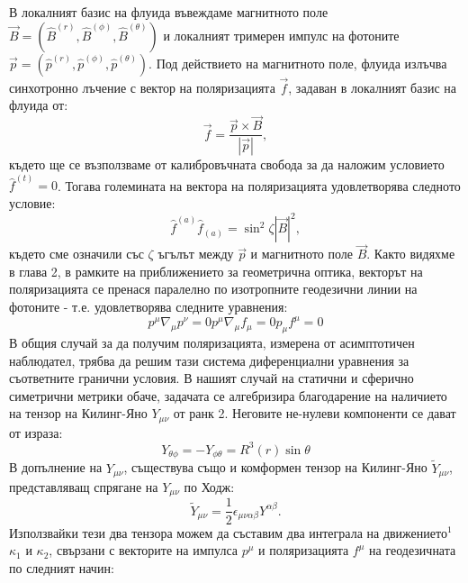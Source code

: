 В локалният базис на флуида въвеждаме магнитното поле $\vec{B} = (\hat{B}^{(r)},\hat{B}^{(\phi)},\hat{B}^{(\theta)})$ и локалният тримерен импулс на фотоните $\vec{p} = \left(\hat{p}^{(r)},\hat{p}^{(\phi)},\hat{p}^{(\theta)}\right)$. Под действието на магнитното поле, флуида излъчва синхотронно лъчение с вектор на поляризацията $\vec{f}$, задаван в локалният базис на флуида от:
\begin{equation}
	\vec{f} = \frac{\vec{p}\times\vec{B}}{|\vec{p}|},
\end{equation}
където ще се възползваме от калибровъчната свобода за да наложим условието $\hat{f}^{(t)} = 0$. Тогава големината на вектора на поляризацията удовлетворява следното условие:
\begin{equation}
	\hat{f}^{(a)}\hat{f}_{(a)} = \sin^2\zeta|\vec{B}|^2,
\end{equation}
където сме означили със $\zeta$ ъгълът между $\vec{p}$ и магнитното поле $\vec{B}$. Както видяхме в глава 2, в рамките на приближението за геометрична оптика, векторът на поляризацията се пренася паралелно по изотропните геодезични линии на фотоните - т.е. удовлетворява следните уравнения:
\begin{subequations}
	\begin{equation}
		p^\mu\nabla_\mu p^\nu = 0
	\end{equation}
	\begin{equation}
		p^\mu\nabla_\mu f_\mu = 0
	\end{equation}
	\begin{equation}
		p_\mu f^\mu = 0
	\end{equation}
\end{subequations}
В общия случай за да получим поляризацията, измерена от асимптотичен наблюдател, трябва да решим тази система диференциални уравнения за съответните гранични условия. В нашият случай на статични и сферично симетрични метрики обаче, задачата се алгебризира благодарение на наличието на тензор на Килинг-Яно $Y_{\mu\nu}$ от ранк 2. Неговите не-нулеви компоненти се дават от израза:
\begin{equation}
	Y_{\theta\phi} = -Y_{\phi\theta} = R^3(r)\sin\theta
\end{equation} 
В допълнение на $Y_{\mu\nu}$, съществува също и комформен тензор на Килинг-Яно $\tilde{Y}_{\mu\nu}$, представляващ спрягане на $Y_{\mu\nu}$ по Ходж:
\begin{equation}
	\tilde{Y}_{\mu\nu} = \frac{1}{2}\epsilon_{\mu\nu\alpha\beta}Y^{\alpha\beta}.
\end{equation}
Използвайки тези два тензора можем да съставим два интеграла на движението$^1$ $\kappa_1$ и $\kappa_2$, свързани с векторите на импулса $p^\mu$ и поляризацията $f^\mu$ на геодезичната по следният начин:
